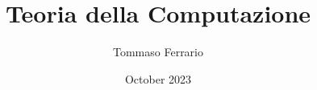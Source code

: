\documentclass[a4paper,15pt, oneside]{book}
\title{Teoria della Computazione}
\author{Tommaso Ferrario}
\date{October 2023}
\begin{document}
\maketitle
\newtheorem{teorema}{Teorema}
\newtheorem{dimostrazione}{Dimostrazione}
\newtheorem{definizione}{Definizione}
\newtheorem{esempio}{Esempio}
\newtheorem{osservazione}{Osservazione}
\newtheorem{nota}{Nota}
\newtheorem{corollario}{Corollario}
\tableofcontents
\renewcommand{\chaptermark}[1]{
  \markboth{\chaptername
    \ \thechapter.\ #1}{}}
\renewcommand{\sectionmark}[1]{\markright{\thesection.\ #1}}





\end{document}
